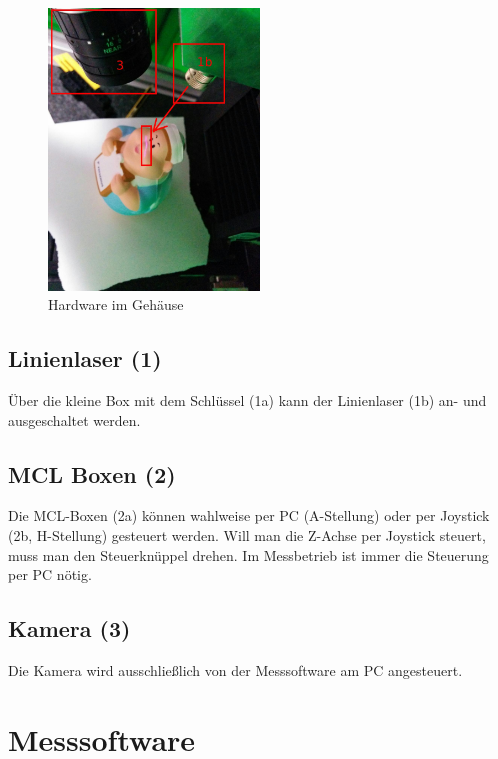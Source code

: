 \documentclass[a4paper,10pt]{scrartcl}
\begin{document}
\begin{figure}[h]
  \centering
  \includegraphics[width=0.5\textwidth]{include/IMG_20160412_135830.jpg}
  \caption{Hardware im Gehäuse}
  \label{fig:overview}
\end{figure}

\newpage
\subsection{Linienlaser (1)}

Über die kleine Box mit dem Schlüssel (1a) kann der Linienlaser (1b) an- und ausgeschaltet werden.

\subsection{MCL Boxen (2)}

Die MCL-Boxen (2a) können wahlweise per PC (A-Stellung) oder per Joystick (2b, H-Stellung) gesteuert
werden. Will man die Z-Achse per Joystick steuert, muss man den Steuerknüppel drehen. Im Messbetrieb
ist immer die Steuerung per PC nötig.

\subsection{Kamera (3)}

Die Kamera wird ausschließlich von der Messsoftware am PC angesteuert.

\newpage

\section{Messsoftware}
\end{document}
